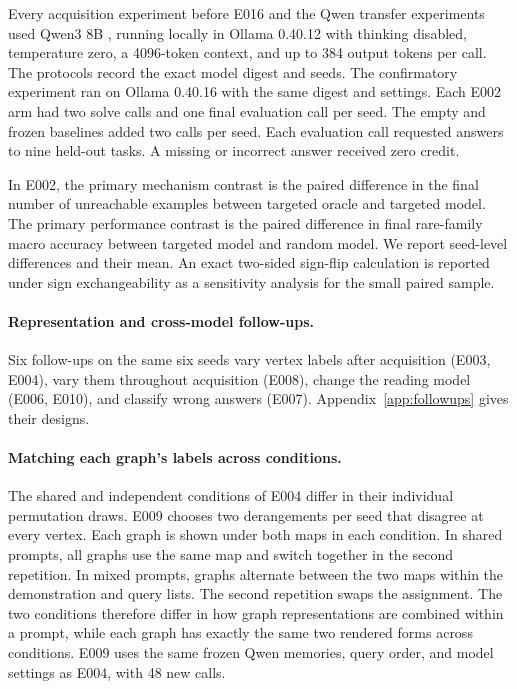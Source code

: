 \documentclass[11pt]{article}
\begin{document}
Every acquisition experiment before E016 and the Qwen transfer
experiments used Qwen3 8B \cite{qwen3},
running locally in Ollama 0.40.12 with thinking disabled, temperature
zero, a 4096-token context, and up to 384 output tokens per call.
The protocols record the exact model digest and seeds. The confirmatory
experiment ran on Ollama 0.40.16 with the
same digest and settings. Each E002 arm
had two solve calls and one final evaluation call per seed. The
empty and frozen baselines added two calls per seed. Each evaluation
call requested answers to nine held-out tasks. A missing
or incorrect answer received zero credit.

In E002, the primary mechanism contrast is the paired difference in the final
number of unreachable examples between targeted oracle and targeted
model. The primary performance contrast is the paired difference in
final rare-family macro accuracy between targeted model and random
model. We report seed-level differences and their mean. An exact
two-sided sign-flip calculation is reported under sign exchangeability
as a sensitivity analysis for the small paired sample.

\paragraph{Representation and cross-model follow-ups.}
Six follow-ups on the same six seeds vary vertex labels after
acquisition (E003, E004), vary them throughout acquisition (E008),
change the reading model (E006, E010), and classify wrong answers
(E007). Appendix~\ref{app:followups} gives their designs.

\paragraph{Matching each graph's labels across conditions.}
The shared and independent conditions of E004 differ in their
individual permutation draws. E009 chooses two derangements per
seed that disagree at every vertex. Each graph is shown under both
maps in each condition. In shared prompts, all graphs use the same
map and switch together in the second repetition. In mixed prompts,
graphs alternate between the two maps within the demonstration and
query lists. The second repetition swaps the assignment. The two
conditions therefore differ in how graph representations are combined
within a prompt, while each graph has exactly the same two rendered
forms across conditions. E009 uses the same frozen Qwen memories,
query order, and model settings as E004, with 48 new calls.
\end{document}
